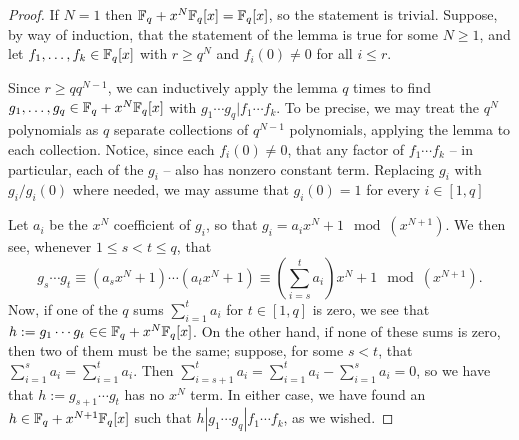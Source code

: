 \begin{proof}
If $N=1$ then $\mathbb{F}_q + x^N\mathbb{F}_q[x] = \mathbb{F}_q[x]$, so the statement is trivial.
Suppose, by way of induction, that the statement of the lemma is true for some $N\ge 1$, and let $f_1,\dots, f_k\in \mathbb{F}_q[x]$ with $r \ge q^N$ and $f_i(0)\neq0$ for all $i\le r$.

Since $r \ge q q^{N-1}$, we can inductively apply the lemma $q$ times to find $g_1,\dots,g_q\in \mathbb{F}_q + x^N \mathbb{F}_q[x]$ with $g_1\cdots g_q | f_1\cdots f_k$.
To be precise, we may treat the $q^N$ polynomials as $q$ separate collections of $q^{N-1}$ polynomials, applying the lemma to each collection.
Notice, since each $f_i(0) \neq 0$, that any factor of $f_1\cdots f_k$ -- in particular, each of the $g_i$ -- also has nonzero constant term.
Replacing $g_i$ with $g_i/g_i(0)$ where needed, we may assume that $g_i(0)=1$ for every $i\in [1,q]$

Let $a_i$ be the $x^N$ coefficient of $g_i$, so that $g_i = a_i x^N + 1 \mod (x^{N+1})$.
We then see, whenever $1\le s<t\le q$, that
\[ g_s\cdots g_t \equiv (a_s x^N + 1)\cdots(a_t x^N + 1) \equiv \left(\sum_{i=s}^t a_i\right) x^N + 1 \mod (x^{N+1}). \]
Now, if one of the $q$ sums $\sum_{i=1}^t a_i$ for $t\in [1,q]$ is zero, we see that $h := g_1\cdots g_t\in \in \mathbb{F}_q + x^N\mathbb{F}_q[x]$.
On the other hand, if none of these sums is zero, then two of them must be the same; suppose, for some $s<t$, that $\sum_{i=1}^s a_i = \sum_{i=1}^t a_i$.
Then $\sum_{i=s+1}^ta_i = \sum_{i=1}^t a_i - \sum_{i=1}^s a_i = 0$, so we have that $h := g_{s+1}\cdots g_t$ has no $x^N$ term.
In either case, we have found an $h\in \mathbb{F}_q + x^{N+1}\mathbb{F}_q[x]$ such that $h | g_1\cdots g_q | f_1\cdots f_k$, as we wished.
\end{proof}

